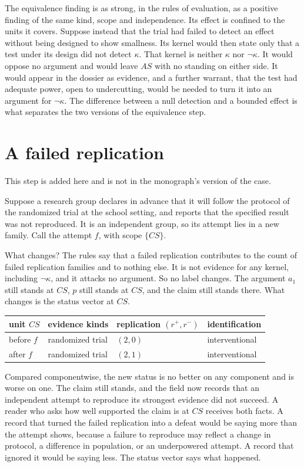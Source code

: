 \documentclass[11pt]{article}
\newcommand{\nk}[1]{\neg #1}
\begin{document}
The equivalence finding is as strong, in the rules of evaluation, as a positive finding of the same kind, scope and independence. Its effect is confined to the units it covers. Suppose instead that the trial had failed to detect an effect without being designed to show smallness. Its kernel would then state only that a test under its design did not detect $\kappa$. That kernel is neither $\kappa$ nor $\nk\kappa$. It would oppose no argument and would leave $AS$ with no standing on either side. It would appear in the dossier as evidence, and a further warrant, that the test had adequate power, open to undercutting, would be needed to turn it into an argument for $\nk\kappa$. The difference between a null detection and a bounded effect is what separates the two versions of the equivalence step.

\section{A failed replication}\label{sec:failed}

This step is added here and is not in the monograph's version of the case.

Suppose a research group declares in advance that it will follow the protocol of the randomized trial at the school setting, and reports that the specified result was not reproduced. It is an independent group, so its attempt lies in a new family. Call the attempt $f$, with scope $\{CS\}$.

What changes? The rules say that a failed replication contributes to the count of failed replication families and to nothing else. It is not evidence for any kernel, including $\nk\kappa$, and it attacks no argument. So no label changes. The argument $a_1$ still stands at $CS$, $p$ still stands at $CS$, and the claim still stands there. What changes is the status vector at $CS$.

\begin{center}
\small
\begin{tabular}{@{}l l l l@{}}
\toprule
unit $CS$ & evidence kinds & replication $(r^+,r^-)$ & identification\\
\midrule
before $f$ & randomized trial & $(2,0)$ & interventional\\
after $f$ & randomized trial & $(2,1)$ & interventional\\
\bottomrule
\end{tabular}
\end{center}

Compared componentwise, the new status is no better on any component and is worse on one. The claim still stands, and the field now records that an independent attempt to reproduce its strongest evidence did not succeed. A reader who asks how well supported the claim is at $CS$ receives both facts. A record that turned the failed replication into a defeat would be saying more than the attempt shows, because a failure to reproduce may reflect a change in protocol, a difference in population, or an underpowered attempt. A record that ignored it would be saying less. The status vector says what happened.
\end{document}
